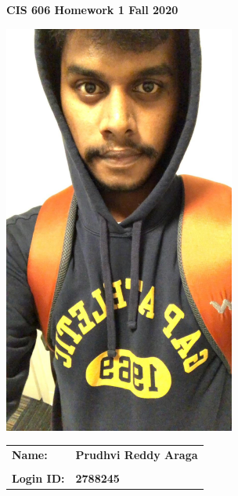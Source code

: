 \documentclass[11pt]{article}
\begin{document}
\thispagestyle{plain}

\begin{center}
{\Large \bf CIS 606 \hfil Homework 1 \hfil Fall 2020} \\
\end{center}

\vskip 1in 

\centerline{\includegraphics[width=3in]{Photo.jpg}}

\vskip 0.5in 

\begin{center}
\begin{tabular}{ll}
{\bf Name:}     & {\bf Prudhvi Reddy Araga } \\ \\
{\bf Login ID:} & {\bf 2788245 }   
\end{tabular}
\end{center}

\newpage
\end{document}

